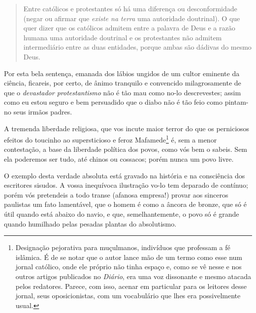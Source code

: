 \begin{quote}
Entre católicos e protestantes só há uma diferença ou desconformidade
(negar ou afirmar que \emph{existe na terra} uma autoridade doutrinal).
O que quer dizer que os católicos admitem entre a palavra de Deus e a
razão humana uma autoridade doutrinal e os protestantes não admitem
intermediário entre as duas entidades, porque ambas são dádivas do mesmo
Deus.
\end{quote}

Por esta bela sentença, emanada dos lábios ungidos de um cultor eminente
da ciência, ficareis, por certo, de ânimo tranquilo e convencido
milagrosamente de que o \emph{devastador protestantismo} não é tão mau
como no-lo descrevestes; assim como eu estou seguro e bem persuadido que
o diabo não é tão feio como pintam-no seus irmãos padres.

A tremenda liberdade religiosa, que vos incute maior terror do que os
perniciosos efeitos do toucinho ao supersticioso e feroz
Mafamede\footnote{Designação pejorativa para muçulmanos, indivíduos
  que professam a fé islâmica. É de se notar que o autor lance mão de um
  termo como esse num jornal católico, onde ele próprio não tinha espaço
  e, como se vê nesse e nos outros artigos publicados no \emph{Diário},
  era uma voz dissonante e mesmo atacada pelos redatores. Parece, com
  isso, acenar em particular para os leitores desse jornal, seus
  oposicionistas, com um vocabulário que lhes era possivelmente usual.}
é, sem a menor contestação, a base da liberdade política dos povos, como
vós bem o sabeis. Sem ela poderemos ser tudo, até chinos ou cossacos;
porém nunca um povo livre.

O exemplo desta verdade absoluta está gravado na história e na
consciência dos escritores sisudos. A vossa inequívoca ilustração vo-lo
tem deparado de contínuo; porém vós pretendeis a todo transe (afanosa
empresa!) provar aos sinceros paulistas um fato lamentável, que o homem
é como a âncora de bronze, que só é útil quando está abaixo do navio, e
que, semelhantemente, o povo só é grande quando humilhado pelas pesadas
plantas do absolutismo.

